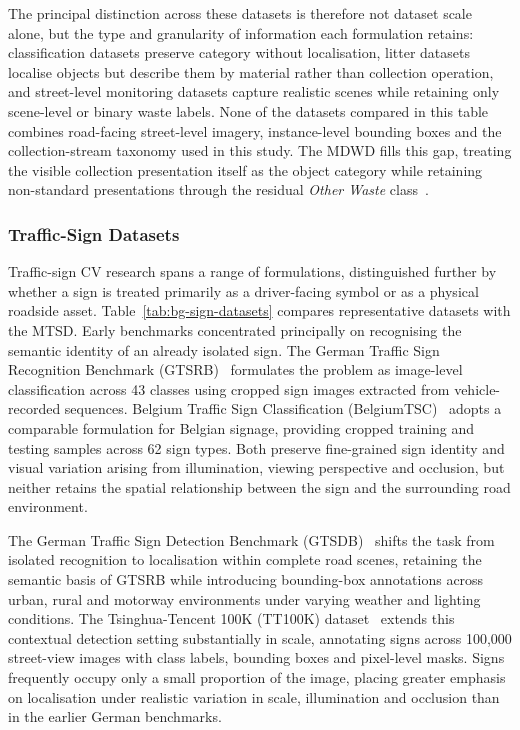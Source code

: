 The principal distinction across these datasets is therefore not dataset scale alone, but the type and granularity of information each formulation retains: classification datas\-ets preserve category without localisation, litter datasets localise objects but describe them by material rather than collection operation, and street-level monitoring datasets capture realistic scenes while retaining only scene-level or binary waste labels. None of the datasets compared in this table combines road-facing street-level imagery, instance-level bounding boxes and the collection-stream taxonomy used in this study. The \gls{MDWD} fills this gap, treating the visible collection presentation itself as the object category while retaining non-standard presentations through the residual \emph{Other Waste} class~\cite{BG15-mdwd}.

\subsubsection{Traffic-Sign Datasets}
\label{sec:bg-sign-datasets}
Traffic-sign \gls{CV} research spans a range of formulations, distinguished further by whether a sign is treated primarily as a driver-facing symbol or as a physical roadside asset. Table~\ref{tab:bg-sign-datasets} compares representative datasets with the \gls{MTSD}. Early benchmarks concentrated principally on recognising the semantic identity of an already isolated sign. The German Traffic Sign Recognition Benchmark (GTSRB)~\cite{stallkamp2012gtsrb} formulates the problem as image-level classification across 43 classes using cropped sign images extracted from vehicle-recorded sequences. Belgium Traffic Sign Classification (BelgiumTSC)~\cite{timofte2014belgiumts} adopts a comparable formulation for Belgian signage, providing cropped training and testing samples across 62 sign types. Both preserve fine-grained sign identity and visual variation arising from illumination, viewing perspective and occlusion, but neither retains the spatial relationship between the sign and the surrounding road environment.

The German Traffic Sign Detection Benchmark (GTSDB)~\cite{houben2013gtsdb} shifts the task from isolated recognition to localisation within complete road scenes, retaining the semantic basis of GTSRB while introducing bounding-box annotations across urban, rural and motorway environments under varying weather and lighting conditions. The Tsinghua-Tencent 100K (TT100K) dataset~\cite{zhu2016tt100k} extends this contextual detection setting substantially in scale, annotating signs across 100,000 street-view images with class labels, bounding boxes and pixel-level masks. Signs frequently occupy only a small proportion of the image, placing greater emphasis on localisation under realistic variation in scale, illumination and occlusion than in the earlier German benchmarks.

